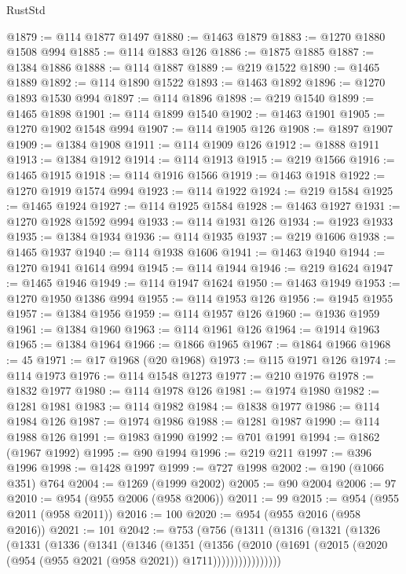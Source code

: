 \begin{lexlean}{RustStd}
\begin{coremodule}
{\begin{coremodule}
{{{{{{{{{{{{{{{{{{{{{{{{{{{{{{{{{{{{{{{{{{{{{{{{{{@1879 := @114 @1877 @1497
@1880 := @1463 @1879
@1883 := @1270 @1880 @1508 @994
@1885 := @114 @1883 @126
@1886 := @1875 @1885
@1887 := @1384 @1886
@1888 := @114 @1887
@1889 := @219 @1522
@1890 := @1465 @1889
@1892 := @114 @1890 @1522
@1893 := @1463 @1892
@1896 := @1270 @1893 @1530 @994
@1897 := @114 @1896
@1898 := @219 @1540
@1899 := @1465 @1898
@1901 := @114 @1899 @1540
@1902 := @1463 @1901
@1905 := @1270 @1902 @1548 @994
@1907 := @114 @1905 @126
@1908 := @1897 @1907
@1909 := @1384 @1908
@1911 := @114 @1909 @126
@1912 := @1888 @1911
@1913 := @1384 @1912
@1914 := @114 @1913
@1915 := @219 @1566
@1916 := @1465 @1915
@1918 := @114 @1916 @1566
@1919 := @1463 @1918
@1922 := @1270 @1919 @1574 @994
@1923 := @114 @1922
@1924 := @219 @1584
@1925 := @1465 @1924
@1927 := @114 @1925 @1584
@1928 := @1463 @1927
@1931 := @1270 @1928 @1592 @994
@1933 := @114 @1931 @126
@1934 := @1923 @1933
@1935 := @1384 @1934
@1936 := @114 @1935
@1937 := @219 @1606
@1938 := @1465 @1937
@1940 := @114 @1938 @1606
@1941 := @1463 @1940
@1944 := @1270 @1941 @1614 @994
@1945 := @114 @1944
@1946 := @219 @1624
@1947 := @1465 @1946
@1949 := @114 @1947 @1624
@1950 := @1463 @1949
@1953 := @1270 @1950 @1386 @994
@1955 := @114 @1953 @126
@1956 := @1945 @1955
@1957 := @1384 @1956
@1959 := @114 @1957 @126
@1960 := @1936 @1959
@1961 := @1384 @1960
@1963 := @114 @1961 @126
@1964 := @1914 @1963
@1965 := @1384 @1964
@1966 := @1866 @1965
@1967 := @1864 @1966
@1968 := 45
@1971 := @17 @1968 (@20 @1968)
@1973 := @115 @1971 @126
@1974 := @114 @1973
@1976 := @114 @1548 @1273
@1977 := @210 @1976
@1978 := @1832 @1977
@1980 := @114 @1978 @126
@1981 := @1974 @1980
@1982 := @1281 @1981
@1983 := @114 @1982
@1984 := @1838 @1977
@1986 := @114 @1984 @126
@1987 := @1974 @1986
@1988 := @1281 @1987
@1990 := @114 @1988 @126
@1991 := @1983 @1990
@1992 := @701 @1991
@1994 := @1862 (@1967 @1992)
@1995 := @90 @1994
@1996 := @219 @211
@1997 := @396 @1996
@1998 := @1428 @1997
@1999 := @727 @1998
@2002 := @190 (@1066 @351) @764
@2004 := @1269 (@1999 @2002)
@2005 := @90 @2004
@2006 := 97
@2010 := @954 (@955 @2006 (@958 @2006))
@2011 := 99
@2015 := @954 (@955 @2011 (@958 @2011))
@2016 := 100
@2020 := @954 (@955 @2016 (@958 @2016))
@2021 := 101
@2042 := @753
    (@756
      (@1311
        (@1316
          (@1321
            (@1326
              (@1331
                (@1336
                  (@1341
                    (@1346
                      (@1351
                        (@1356
                          (@2010
                            (@1691
                              (@2015 (@2020 (@954 (@955 @2021 (@958 @2021)) @1711))))))))))))))))
}}}}}}}}}}}}}}}}}}}}}}}}}}}}}}}}}}}}}}}}}}}}}}}}}}
\end{coremodule}}
\end{coremodule}
\end{lexlean}
